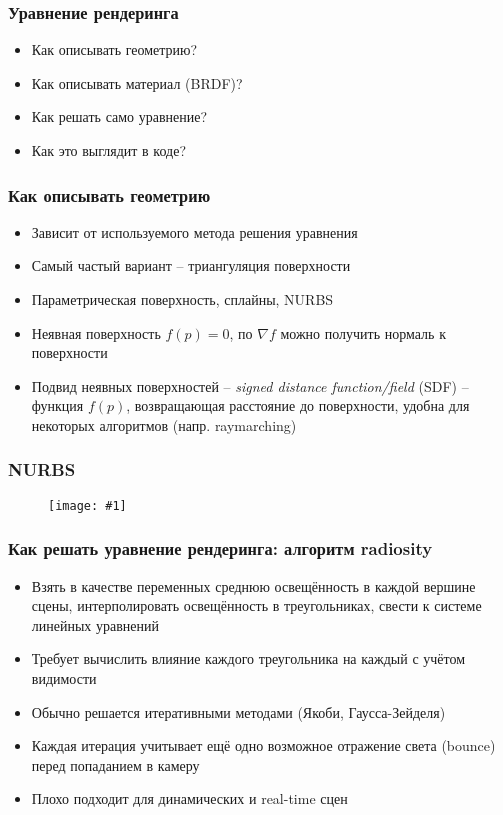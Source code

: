 \documentclass[10pt]{beamer}
\newcommand{\slideimage}[1]{
  \begin{figure}
    \begin{adjustbox}{width=\textwidth, totalheight=\textheight-2\baselineskip-2\baselineskip,keepaspectratio}
      \texttt{[image: \#1]}
    \end{adjustbox}
  \end{figure}
}
\begin{document}
\begin{frame}[fragile]
\frametitle{Уравнение рендеринга}
\begin{itemize}
\item Как описывать геометрию?
\pause
\item Как описывать материал (BRDF)?
\pause
\item Как решать само уравнение?
\pause
\item Как это выглядит в коде?
\end{itemize}
\end{frame}

\begin{frame}[fragile]
\frametitle{Как описывать геометрию}
\begin{itemize}
\item Зависит от используемого метода решения уравнения
\pause
\item Самый частый вариант -- триангуляция поверхности
\pause
\item Параметрическая поверхность, сплайны, NURBS
\pause
\item Неявная поверхность \begin{math}f(p) = 0\end{math}, по \begin{math}\nabla f\end{math} можно получить нормаль к поверхности
\pause
\item Подвид неявных поверхностей -- \textit{signed distance function/field} (SDF) -- функция \begin{math}f(p)\end{math}, возвращающая расстояние до поверхности, удобна для некоторых алгоритмов (напр. raymarching)
\end{itemize}
\end{frame}

\begin{frame}[fragile]
\frametitle{NURBS}
\slideimage{nurbs.png}
\end{frame}

\begin{frame}[fragile]
\frametitle{Как решать уравнение рендеринга: алгоритм radiosity}
\begin{itemize}
\item Взять в качестве переменных среднюю освещённость в каждой вершине сцены, интерполировать освещённость в треугольниках, свести к системе линейных уравнений
\pause
\item Требует вычислить влияние каждого треугольника на каждый с учётом видимости
\pause
\item Обычно решается итеративными методами (Якоби, Гаусса-Зейделя)
\pause
\item Каждая итерация учитывает ещё одно возможное отражение света (bounce) перед попаданием в камеру
\pause
\item Плохо подходит для динамических и real-time сцен
\end{itemize}
\end{frame}
\end{document}
